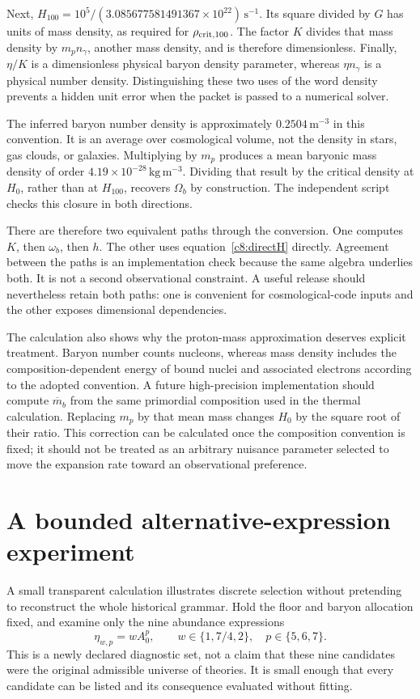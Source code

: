 Next, $H_{100}=10^5/(3.085677581491367\times10^{22})\,\mathrm{s^{-1}}$. Its square divided by $G$ has units of mass density, as required for $\rho_{\rm crit,100}$. The factor $K$ divides that mass density by $m_pn_\gamma$, another mass density, and is therefore dimensionless. Finally, $\eta/K$ is a dimensionless physical baryon density parameter, whereas $\eta n_\gamma$ is a physical number density. Distinguishing these two uses of the word density prevents a hidden unit error when the packet is passed to a numerical solver.

The inferred baryon number density is approximately $0.2504\,\mathrm{m^{-3}}$ in this convention. It is an average over cosmological volume, not the density in stars, gas clouds, or galaxies. Multiplying by $m_p$ produces a mean baryonic mass density of order $4.19\times10^{-28}\,\mathrm{kg\,m^{-3}}$. Dividing that result by the critical density at $H_0$, rather than at $H_{100}$, recovers $\Omega_b$ by construction. The independent script checks this closure in both directions.

There are therefore two equivalent paths through the conversion. One computes $K$, then $\omega_b$, then $h$. The other uses equation~\eqref{c8:directH} directly. Agreement between the paths is an implementation check because the same algebra underlies both. It is not a second observational constraint. A useful release should nevertheless retain both paths: one is convenient for cosmological-code inputs and the other exposes dimensional dependencies.

The calculation also shows why the proton-mass approximation deserves explicit treatment. Baryon number counts nucleons, whereas mass density includes the composition-dependent energy of bound nuclei and associated electrons according to the adopted convention. A future high-precision implementation should compute $\overline m_b$ from the same primordial composition used in the thermal calculation. Replacing $m_p$ by that mean mass changes $H_0$ by the square root of their ratio. This correction can be calculated once the composition convention is fixed; it should not be treated as an arbitrary nuisance parameter selected to move the expansion rate toward an observational preference.

\section{A bounded alternative-expression experiment}
A small transparent calculation illustrates discrete selection without pretending to reconstruct the whole historical grammar. Hold the floor and baryon allocation fixed, and examine only the nine abundance expressions
\begin{equation}
 \eta_{w,p}=wA_0^p,\qquad
 w\in\{1,7/4,2\},\quad p\in\{5,6,7\}.
 \label{c8:ninegrammar}
\end{equation}
This is a newly declared diagnostic set, not a claim that these nine candidates were the original admissible universe of theories. It is small enough that every candidate can be listed and its consequence evaluated without fitting.


